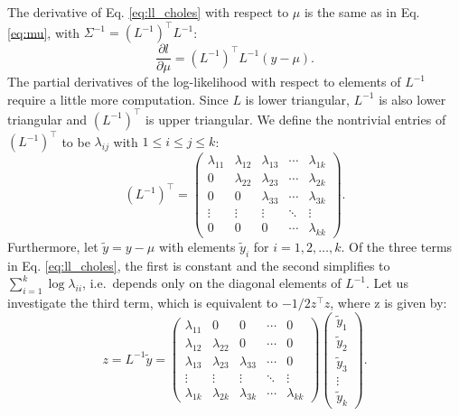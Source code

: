 \documentclass{article}
\begin{document}
The derivative of Eq. \ref{eq:ll_choles} with respect to $\mu$ is the same 
as in Eq. \ref{eq:mu}, with $\Sigma^{-1} =  (L^{-1})^\top L^{-1}$:
%
\begin{equation}
 \frac{\partial l}{\partial \mu} = (L^{-1})^\top L^{-1} (y-\mu).
 \label{eq:mu_chol}
\end{equation}
%
The partial derivatives of the log-likelihood with respect to elements of 
$L^{-1}$ require a little more computation. Since $L$ is lower triangular, 
$L^{-1}$ is also lower triangular and $(L^{-1})^\top$ is upper triangular. 
We define the nontrivial entries of $(L^{-1})^\top$ to be $\lambda_{ij}$ 
with $1 \leq i \leq j \leq k$: 
%
\begin{equation}
	(L^{-1})^\top=
  \begin{pmatrix}
    \lambda_{11} & \lambda_{12} & \lambda_{13} & \cdots & \lambda_{1k} \\
    0 & \lambda_{22} & \lambda_{23} & \cdots & \lambda_{2k} \\
    0 & 0 & \lambda_{33} & \cdots & \lambda_{3k} \\
    \vdots & \vdots & \vdots & \ddots & \vdots \\
    0 & 0 & 0 & \cdots & \lambda_{kk}
  \end{pmatrix}.
\end{equation}
%
Furthermore, let $\tilde{y} = y - \mu$ with elements $\tilde{y}_i$ for 
$i = 1, 2, \dots, k$. 
Of the three terms in Eq. \ref{eq:ll_choles}, the first is constant and the 
second simplifies to $\sum_{i=1}^k \log{\lambda_{ii}}$, i.e.\ depends only 
on the diagonal elements of $L^{-1}$. Let us investigate the third term, which 
is equivalent to $-1/2 z^\top z$, where z is given by:
%
\begin{equation}
	z = L^{-1} \tilde{y}=
  \begin{pmatrix}
    \lambda_{11} & 0 & 0 & \cdots & 0 \\
    \lambda_{12} & \lambda_{22} & 0 & \cdots & 0 \\
    \lambda_{13} & \lambda_{23} & \lambda_{33} & \cdots & 0 \\
    \vdots & \vdots & \vdots & \ddots & \vdots \\
    \lambda_{1k} & \lambda_{2k} & \lambda_{3k} & \cdots & \lambda_{kk}
  \end{pmatrix}
  \begin{pmatrix}
    \tilde{y}_1 \\
    \tilde{y}_2 \\
    \tilde{y}_3	\\
    \vdots \\
    \tilde{y}_k
  \end{pmatrix}.
\end{equation}
\end{document}
